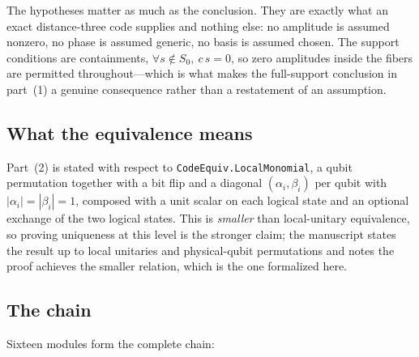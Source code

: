 \documentclass[11pt,a4paper]{article}
\newcommand{\Sz}{S_0}
\newcommand{\lean}[1]{\texttt{#1}}
\theoremstyle{definition}
\begin{document}
The hypotheses matter as much as the conclusion. They are exactly what an exact
distance-three code supplies and nothing else: no amplitude is assumed nonzero,
no phase is assumed generic, no basis is assumed chosen. The support conditions
are containments, $\forall s \notin \Sz,\ c\,s = 0$, so zero amplitudes inside
the fibers are permitted throughout---which is what makes the full-support
conclusion in part~(1) a genuine consequence rather than a restatement of an
assumption.

\subsection{What the equivalence means}

Part~(2) is stated with respect to \lean{CodeEquiv.LocalMonomial}, a qubit
permutation together with a bit flip and a diagonal $(\alpha_i,\beta_i)$ per
qubit with $|\alpha_i| = |\beta_i| = 1$, composed with a unit scalar on each
logical state and an optional exchange of the two logical states. This is
\emph{smaller} than local-unitary equivalence, so proving uniqueness at this
level is the stronger claim; the manuscript states the result up to local
unitaries and physical-qubit permutations and notes the proof achieves the
smaller relation, which is the one formalized here.

\subsection{The chain}

Sixteen modules form the complete chain:
\end{document}
